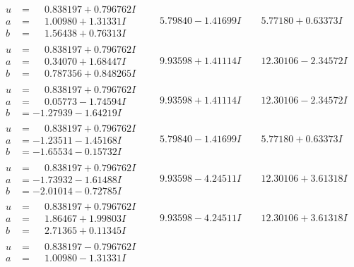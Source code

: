 \documentclass[1p]{elsarticle_modified}
\theoremstyle{definition}
\begin{document}
$$\begin{array}{c|c|c}
\begin{aligned}
u &= \phantom{-}0.838197 + 0.796762 I \\
a &= \phantom{-}1.00980 + 1.31331 I \\
b &= \phantom{-}1.56438 + 0.76313 I\end{aligned}
 & \phantom{-}5.79840 - 1.41699 I & \phantom{-}5.77180 + 0.63373 I \\ \hline\begin{aligned}
u &= \phantom{-}0.838197 + 0.796762 I \\
a &= \phantom{-}0.34070 + 1.68447 I \\
b &= \phantom{-}0.787356 + 0.848265 I\end{aligned}
 & \phantom{-}9.93598 + 1.41114 I & \phantom{-}12.30106 - 2.34572 I \\ \hline\begin{aligned}
u &= \phantom{-}0.838197 + 0.796762 I \\
a &= \phantom{-}0.05773 - 1.74594 I \\
b &= -1.27939 - 1.64219 I\end{aligned}
 & \phantom{-}9.93598 + 1.41114 I & \phantom{-}12.30106 - 2.34572 I \\ \hline\begin{aligned}
u &= \phantom{-}0.838197 + 0.796762 I \\
a &= -1.23511 - 1.45168 I \\
b &= -1.65534 - 0.15732 I\end{aligned}
 & \phantom{-}5.79840 - 1.41699 I & \phantom{-}5.77180 + 0.63373 I \\ \hline\begin{aligned}
u &= \phantom{-}0.838197 + 0.796762 I \\
a &= -1.73932 - 1.61488 I \\
b &= -2.01014 - 0.72785 I\end{aligned}
 & \phantom{-}9.93598 - 4.24511 I & \phantom{-}12.30106 + 3.61318 I \\ \hline\begin{aligned}
u &= \phantom{-}0.838197 + 0.796762 I \\
a &= \phantom{-}1.86467 + 1.99803 I \\
b &= \phantom{-}2.71365 + 0.11345 I\end{aligned}
 & \phantom{-}9.93598 - 4.24511 I & \phantom{-}12.30106 + 3.61318 I \\ \hline\begin{aligned}
u &= \phantom{-}0.838197 - 0.796762 I \\
a &= \phantom{-}1.00980 - 1.31331 I \\

\end{aligned}
\end{array}$$
\end{document}

